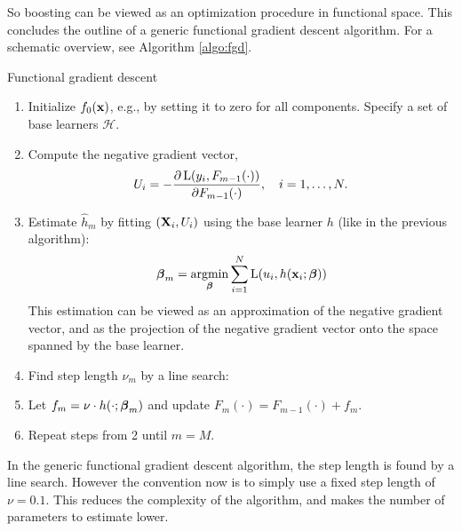 So boosting can be viewed as an optimization procedure in functional space. This concludes the outline of a generic functional gradient descent algorithm. For a schematic overview, see Algorithm \ref{algo:fgd}.
\begin{algorithm}
\caption{Functional gradient descent}
\label{algo:fgd}
\begin{enumerate}
    \item Initialize $f_0(\mathbf{x})$, e.g., by setting it to zero for all components. Specify a set of base learners $\mathcal{H}$.
    \item Compute the negative gradient vector,
        \begin{equation*}
            U_i=-\frac{\partial \operatorname{L}(y_i,F_{m-1}(\cdot))}{\partial F_{m-1}(\cdot)},\quad i=1,\dotsc,N.
        \end{equation*}
    \item Estimate $\hat{h}_m$ by fitting $(\mathbf{X}_i,U_i)$ using the base learner $h$ (like in the previous algorithm):
        \begin{equation*}
            \boldsymbol{\beta}_m=\operatorname*{argmin}_{\boldsymbol{\beta}}\sum_{i=1}^N\operatorname{L}(u_i,h(\mathbf{x}_i;\boldsymbol{\beta}))
        \end{equation*}
        This estimation can be viewed as an approximation of the negative gradient vector, and as the projection of the negative gradient vector onto the space spanned by the base learner.
    \item Find step length $\nu_m$ by a line search:
    \item Let $f_m=\nu\cdot h(\cdot;\boldsymbol{\beta}_m)$ and update $F_m(\cdot)=F_{m-1}(\cdot)+f_m$.
    \item Repeat steps from 2 until $m=M$.
\end{enumerate}
\end{algorithm}
In the generic functional gradient descent algorithm, the step length is found by a line search. However the convention now is to simply use a fixed step length of $\nu=0.1$. This reduces the complexity of the algorithm, and makes the number of parameters to estimate lower.

